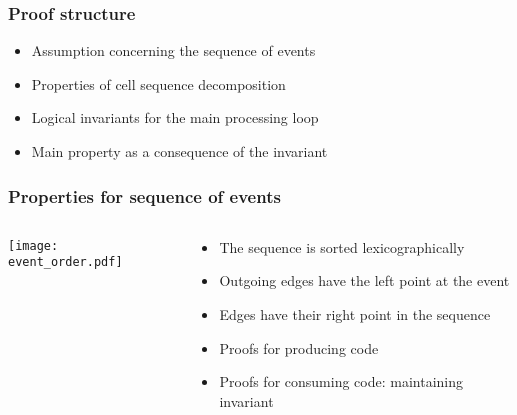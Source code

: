 \documentclass[compress]{beamer}
\begin{document}
\begin{frame}
\frametitle{Proof structure}
\begin{itemize}
\item Assumption concerning the sequence of events
\item Properties of cell sequence decomposition
\item Logical invariants for the main processing loop
\item Main property as a consequence of the invariant
\end{itemize}
\end{frame}
\begin{frame}
\frametitle{Properties for sequence of events}
\begin{columns}
\begin{column}{0.2\textwidth}
{\texttt{[image: event\_order.pdf]}}
\end{column}
\begin{column}{0.8\textwidth}
\begin{itemize}
\item The sequence is sorted lexicographically
\item Outgoing edges have the left point at the event
\item Edges have their right point in the sequence
\item Proofs for producing code
\item Proofs for consuming code: maintaining invariant
\end{itemize}
\end{column}
\end{columns}
\end{frame}
\end{document}
